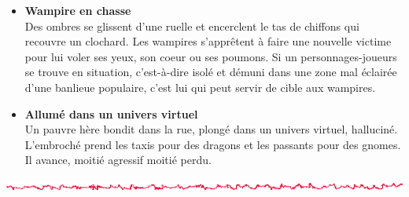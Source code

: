 \documentclass[11pt,twoside,a4paper]{article}
\def\barreCyberAge{\includegraphics[width=\textwidth]{img/Filet_CA.png}}
\begin{document}
{{\begin{minipage}[ht]{0.95\textwidth}
\begin{itemize}
		\item[] \textbf{Wampire en chasse}~\\
			Des ombres se glissent d'une ruelle et encerclent le tas de chiffons qui recouvre un clochard. Les wampires s'appr{\^e}tent {\`a} faire une nouvelle victime pour lui voler ses yeux, son coeur ou ses poumons. Si un personnages-joueurs se trouve en situation, c'est-{\`a}-dire isol{\'e} et d{\'e}muni dans une zone mal {\'e}clair{\'e}e d'une banlieue populaire, c'est lui qui peut servir de cible aux wampires. 
		\item[] \textbf{Allum{\'e} dans un univers virtuel}~\\
			Un pauvre h{\`e}re bondit dans la rue, plong{\'e} dans un univers virtuel, hallucin{\'e}. L'embroch{\'e} prend les taxis pour des dragons et les passants pour des gnomes. Il avance, moiti{\'e} agressif moiti{\'e} perdu. 
	\end{itemize}
\end{minipage} } }%

\barreCyberAge

\clearpage
\end{document}
